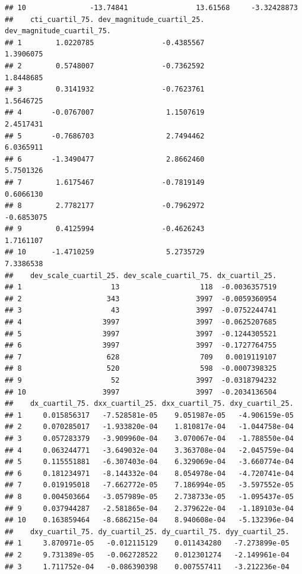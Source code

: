 \documentclass[11pt,]{article}
\begin{document}
\begin{verbatim}
## 10               -13.74841                13.61568     -3.32428873
##    cti_cuartil_75. dev_magnitude_cuartil_25. dev_magnitude_cuartil_75.
## 1        1.0220785                -0.4385567                 1.3906075
## 2        0.5748007                -0.7362592                 1.8448685
## 3        0.3141932                -0.7623761                 1.5646725
## 4       -0.0767007                 1.1507619                 2.4517431
## 5       -0.7686703                 2.7494462                 6.0365911
## 6       -1.3490477                 2.8662460                 5.7501326
## 7        1.6175467                -0.7819149                 0.6066130
## 8        2.7782177                -0.7962972                -0.6853075
## 9        0.4125994                -0.4626243                 1.7161107
## 10      -1.4710259                 5.2735729                 7.3386538
##    dev_scale_cuartil_25. dev_scale_cuartil_75. dx_cuartil_25.
## 1                     13                   118  -0.0036357519
## 2                    343                  3997  -0.0059360954
## 3                     43                  3997  -0.0752244741
## 4                   3997                  3997  -0.0625207685
## 5                   3997                  3997  -0.1244305521
## 6                   3997                  3997  -0.1727764755
## 7                    628                   709   0.0019119107
## 8                    520                   598  -0.0007398325
## 9                     52                  3997  -0.0318794232
## 10                  3997                  3997  -0.2034136504
##    dx_cuartil_75. dxx_cuartil_25. dxx_cuartil_75. dxy_cuartil_25.
## 1     0.015856317   -7.528581e-05    9.051987e-05   -4.906159e-05
## 2     0.070285017   -1.933820e-04    1.810817e-04   -1.044758e-04
## 3     0.057283379   -3.909960e-04    3.070067e-04   -1.788550e-04
## 4     0.063244771   -3.649032e-04    3.363708e-04   -2.045759e-04
## 5     0.115551881   -6.307403e-04    6.329069e-04   -3.660774e-04
## 6     0.181234971   -8.144332e-04    8.054978e-04   -4.720741e-04
## 7     0.019195018   -7.662772e-05    7.186994e-05   -3.597552e-05
## 8     0.004503664   -3.057989e-05    2.738733e-05   -1.095437e-05
## 9     0.037944287   -2.581865e-04    2.379622e-04   -1.189103e-04
## 10    0.163859464   -8.686215e-04    8.940608e-04   -5.132396e-04
##    dxy_cuartil_75. dy_cuartil_25. dy_cuartil_75. dyy_cuartil_25.
## 1     3.870971e-05   -0.012115129    0.011434280   -7.273899e-05
## 2     9.731389e-05   -0.062728522    0.012301274   -2.149961e-04
## 3     1.711752e-04   -0.086390398    0.007557411   -3.212236e-04

\end{verbatim}
\end{document}
